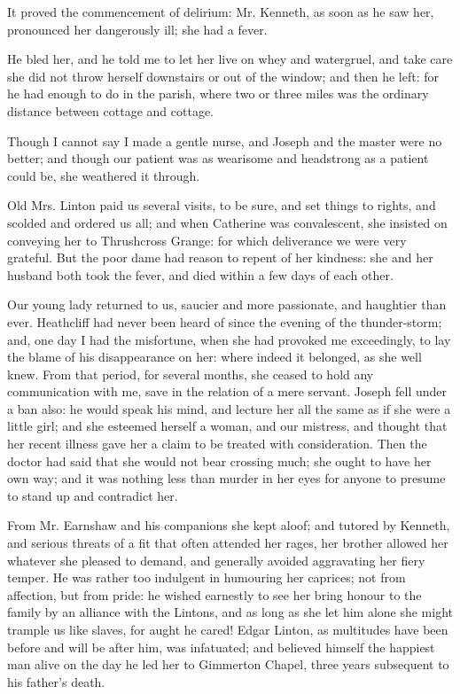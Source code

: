 \par It proved the commencement of delirium: Mr. Kenneth, as soon as he saw her, pronounced her dangerously ill; she had a fever.
\par He bled her, and he told me to let her live on whey and watergruel, and take care she did not throw herself downstairs or out of the window; and then he left: for he had enough to do in the parish, where two or three miles was the ordinary distance between cottage and cottage.
\par Though I cannot say I made a gentle nurse, and Joseph and the master were no better; and though our patient was as wearisome and headstrong as a patient could be, she weathered it through.
\par Old Mrs. Linton paid us several visits, to be sure, and set things to rights, and scolded and ordered us all; and when Catherine was convalescent, she insisted on conveying her to Thrushcross Grange: for which deliverance we were very grateful. But the poor dame had reason to repent of her kindness: she and her husband both took the fever, and died within a few days of each other.
\par Our young lady returned to us, saucier and more passionate, and haughtier than ever. Heathcliff had never been heard of since the evening of the thunder-storm; and, one day I had the misfortune, when she had provoked me exceedingly, to lay the blame of his disappearance on her: where indeed it belonged, as she well knew. From that period, for several months, she ceased to hold any communication with me, save in the relation of a mere servant. Joseph fell under a ban also: he would speak his mind, and lecture her all the same as if she were a little girl; and she esteemed herself a woman, and our mistress, and thought that her recent illness gave her a claim to be treated with consideration. Then the doctor had said that she would not bear crossing much; she ought to have her own way; and it was nothing less than murder in her eyes for anyone to presume to stand up and contradict her.
\par From Mr. Earnshaw and his companions she kept aloof; and tutored by Kenneth, and serious threats of a fit that often attended her rages, her brother allowed her whatever she pleased to demand, and generally avoided aggravating her fiery temper. He was rather too indulgent in humouring her caprices; not from affection, but from pride: he wished earnestly to see her bring honour to the family by an alliance with the Lintons, and as long as she let him alone she might trample us like slaves, for aught he cared! Edgar Linton, as multitudes have been before and will be after him, was infatuated; and believed himself the happiest man alive on the day he led her to Gimmerton Chapel, three years subsequent to his father's death.
